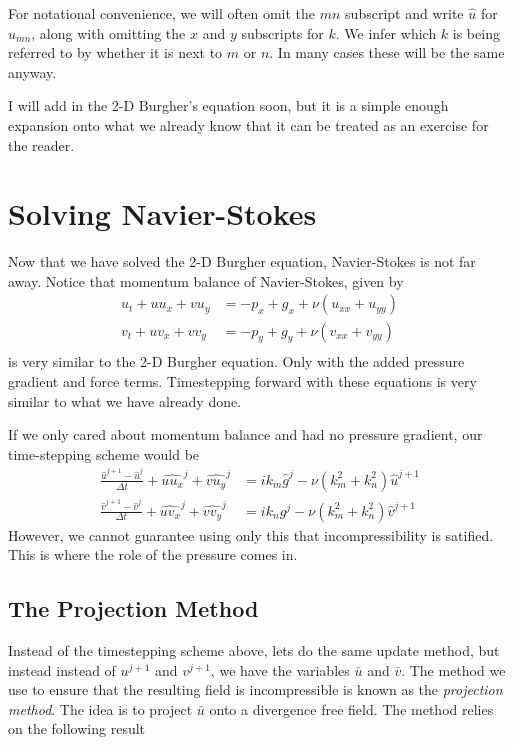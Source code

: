 \documentclass[a4paper,11pt]{article}
\theoremstyle{plain} %
\theoremstyle{remark}
\theoremstyle{definition} %
\begin{document}
For notational convenience, we will often omit the $mn$ subscript and write $\widehat{u}$ for $\widehat{u}_{mn}$, along with omitting the $x$ and $y$ subscripts for $k$. We infer which $k$ is being referred to by whether it is next to $m$ or $n$. In many cases these will be the same anyway. 

I will add in the 2-D Burgher's equation soon, but it is a simple enough expansion onto what we already know that it can be treated as an exercise for the reader.

\section{Solving Navier-Stokes}
Now that we have solved the 2-D Burgher equation, Navier-Stokes is not far away. Notice that momentum balance of Navier-Stokes, given by
\begin{align*}
u_t+u u_x+v u_y &= -p_x + g_x + \nu \left(u_{xx}+u_{yy}\right)\\ 
v_t+u v_x+v v_y &= -p_y + g_y + \nu \left(v_{xx}+v_{yy}\right) \\ 
\end{align*}
is very similar to the 2-D Burgher equation. Only with the added pressure gradient and force terms. Timestepping forward with these equations is very similar to what we have already done. 

If we only cared about momentum balance and had no pressure gradient, our time-stepping scheme would be
\begin{align*}
\frac{\widehat{u}^{j+1}-\widehat{u}^j}{\Delta t} +\widehat{u u_x}^j + \widehat{v u_y}^j &= ik_m\widehat{g}^j - \nu (k_m^2+k_n^2)\widehat{u}^{j+1} \\
\frac{\widehat{v}^{j+1}-\widehat{v}^j}{\Delta t} +\widehat{u v_x}^j + \widehat{v v_y}^j &= ik_ng^j - \nu (k_m^2+k_n^2)\widehat{v}^{j+1}
\end{align*}
However, we cannot guarantee using only this that incompressibility is satified. This is where the role of the pressure comes in. 

\subsection{The Projection Method}
Instead of the timestepping scheme above, lets do the same update method, but instead instead of $u^{j+1}$ and $v^{j+1}$, we have the variables $\bar{u}$ and $\bar{v}$. The method we use to ensure that the resulting field is incompressible is known as the \emph{projection method}. The idea is to project $\bar{u}$ onto a divergence free field. The method relies on the following result
\end{document}
